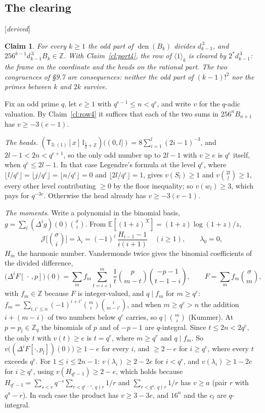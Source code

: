 \documentclass[11pt]{article}
\newcommand{\oE}{\mathbb E}
\newcommand{\sT}{\mathsf T}
\newcommand{\Ilat}[1]{\mathbb I_{#1}}
\newcommand{\Th}[4]{(\sT_{#1;(1)}[x]\,#2)((#3,#4])}
\newcommand{\status}[1]{\hfill{\small[\textit{#1}]}}
\theoremstyle{plain}
\newtheorem{claim}{Claim}[section]
\theoremstyle{remark}
\begin{document}
\subsection{The clearing}\status{derived}

\begin{claim}\label{cl:clear4}
For every $k\ge1$ the odd part of $\operatorname{den}(B_k)$ divides $d_{k-1}^{\,3}$, and $256^{k-1}d_{k-1}^{\,3}B_k\in\mathbb Z$. With Claim~\ref{cl:port4}, the row of $\langle1\rangle_k$ is cleared by $2^{\ast}d_{k-1}^{\,3}$: the frame on the coordinate and the heads on the rational part. The two congruences of \S9.7 are consequences: neither the odd part of $(k-1)!^2$ nor the primes between $k$ and $2k$ survive.
\end{claim}

Fix an odd prime $q$, let $e\ge1$ with $q^{e-1}\le n<q^e$, and write $v$ for the $q$-adic valuation. By Claim~\ref{cl:row4} it suffices that each of the two sums in $256^nB_{n+1}$ has $v\ge-3(e-1)$.

\emph{The heads.} $\Th{3}{\Ilat{\frac12+\mathbb Z}}{0}{l}=8\sum_{i=1}^{l}(2i-1)^{-3}$, and $2l-1<2n<q^{e+1}$, so the only odd number up to $2l-1$ with $v\ge e$ is $q^e$ itself, when $q^e\le2l-1$. In that case Legendre's formula at the level $q^e$, where $\lfloor l/q^e\rfloor=\lfloor j/q^e\rfloor=\lfloor n/q^e\rfloor=0$ and $\lfloor2l/q^e\rfloor=1$, gives $v(S_l)\ge1$ and $v\binom{2l}l\ge1$, every other level contributing $\ge0$ by the floor inequality; so $v(w_l)\ge3$, which pays for $q^{-3e}$. Otherwise the head already has $v\ge-3(e-1)$.

\emph{The moments.} Write a polynomial in the binomial basis, $g=\sum_i(\Delta^ig)(0)\binom\sigma i$. From $\oE[(1+z)^X]=(1+z)\log(1+z)/z$,
\[
\mathcal J\Big[\binom\sigma i\Big]=\lambda_i=(-1)^i\,\frac{H_{i-1}-1}{i(i+1)}\quad(i\ge1),\qquad\lambda_0=0,
\]
$H_m$ the harmonic number. Vandermonde twice gives the binomial coefficients of the divided difference,
\[
\big(\Delta^iF[\,\cdot\,,p]\big)(0)=\sum_{m}f_m\sum_{t=i+1}^{m}\frac1t\binom{p}{m-t}\binom{-p-1}{t-1-i},\qquad F=\sum_mf_m\binom\sigma m,
\]
with $f_m\in\mathbb Z$ because $F$ is integer-valued, and $q\mid f_m$ for $m\ge q^e$: $f_m=\sum_{i,i'\le n}(-1)^{i+i'}\binom mi\binom i{m-i'}$, and when $m\ge q^e>n$ the addition $i+(m-i)$ of two numbers below $q^e$ carries, so $q\mid\binom mi$ (Kummer). At $p=p_l\in\mathbb Z_q$ the binomials of $p$ and of $-p-1$ are $q$-integral. Since $t\le2n<2q^e$, the only $t$ with $v(t)\ge e$ is $t=q^e$, where $m\ge q^e$ and $q\mid f_m$. So $v\big((\Delta^iF[\cdot,p_l])(0)\big)\ge1-e$ for every $i$, and $\ge2-e$ for $i\ge q^e$, where every $t$ exceeds $q^e$. For $1\le i\le2n-1$: $v(\lambda_i)\ge2-2e$ for $i<q^e$, and $v(\lambda_i)\ge1-2e$ for $i\ge q^e$, using $v(H_{q^e-1})\ge2-e$, which holds because $H_{q^e-1}=\sum_{s<e}q^{-s}\sum_{r<q^{e-s},\,q\nmid r}1/r$ and $\sum_{r<q^a,\,q\nmid r}1/r$ has $v\ge a$ (pair $r$ with $q^a-r$). In each case the product has $v\ge3-3e$, and $16^n$ and the $c_l$ are $q$-integral.
\end{document}
